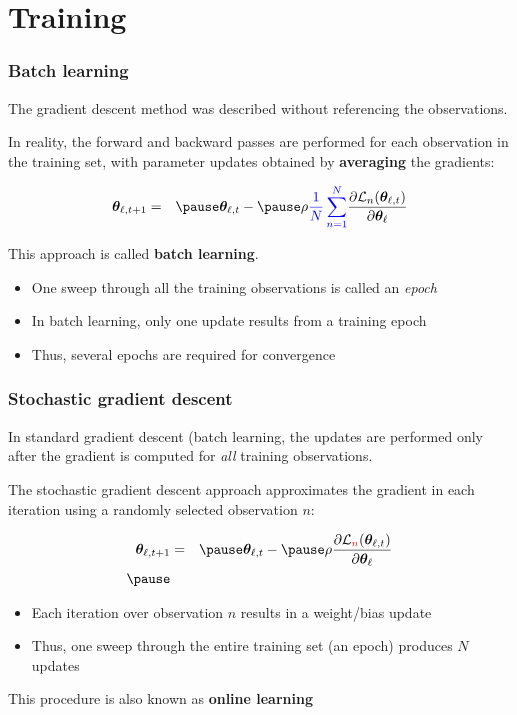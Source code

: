 \documentclass[smaller, handout]{beamer}
\begin{document}
\section{Training}
\begin{frame}
  \frametitle{Batch learning}
  The gradient descent method was described without referencing the observations. \pause

  \medskip

  In reality, the forward and backward passes are performed for each observation in the training set, with parameter updates obtained by
  \textbf{\bl averaging} the gradients: \pause

  \begin{eqnarray}
    \bm\th_{\ell, t+1}  &=& \pause  \bm\th_{\ell,t} - \pause \rho{\bl  \fr1N \sum_{n=1}^N}\pd{\mc{L}_n(\bm \th_{\ell,t})}{\bm\th_{\ell}} 
   \end{eqnarray}

  \pause

  This approach is called \textbf{\bl batch learning}. \pause

  \begin{itemize}[<+->]
  \item One sweep through all the training observations is called an \textit{epoch}
  \item In batch learning, only one update results from a training epoch
  \item Thus, several epochs are required for convergence
  \end{itemize}
\end{frame}

\begin{frame}
  \frametitle{Stochastic gradient descent}
  \pause

  In standard gradient descent (batch learning, the updates are performed only after the gradient is computed for \textit{all} training observations.

  \pause

  \medskip
  
  The stochastic gradient descent approach approximates the gradient in each iteration using a {\rd randomly selected}  observation $n$: \pause

    \begin{eqnarray}
    \bm\th_{\ell, t+1}  &=& \pause  \bm\th_{\ell,t} - \pause \rho \pd{\mc{L}_{\rd n}(\bm \th_{\ell,t})}{\bm\th_{\ell}}  \\\pause
  \end{eqnarray}

  \pause

  \begin{itemize}[<+->]
  \item Each iteration over observation $n$ results in a weight/bias update
  \item Thus, one sweep through the entire training set (an epoch) produces $N$ updates
  \end{itemize}
  \pause
  This procedure is also known as \textbf{\rd online learning}
\end{frame}
\end{document}
